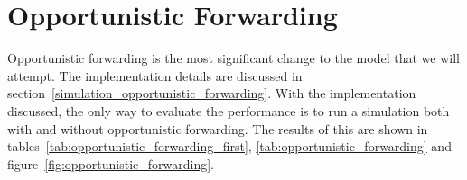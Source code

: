     \section{Opportunistic Forwarding}\label{data_gathering_performance_opportunistic_forwarding}

        Opportunistic forwarding is the most significant change to the model that we will attempt. The implementation details are discussed in section~\ref{simulation_opportunistic_forwarding}. With the implementation discussed, the only way to evaluate the performance is to run a simulation both with and without opportunistic forwarding. The results of this are shown in tables~\ref{tab:opportunistic_forwarding_first}, \ref{tab:opportunistic_forwarding} and figure~\ref{fig:opportunistic_forwarding}.

